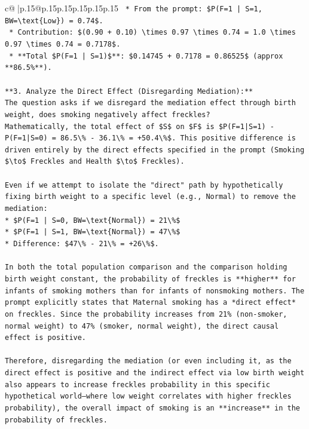 \documentclass{article}
\begin{document}
{\begin{supertabular}{c@{$\;$}|p{.15\linewidth}@{}p{.15\linewidth}p{.15\linewidth}p{.15\linewidth}p{.15\linewidth}p{.15\linewidth}}
{{{\texttt{        *   From the prompt: \$P(F=1 | S=1, BW=\textbackslash{}text\{Low\}) = 0.74\$.} \\
\texttt{        *   Contribution: \$(0.90 + 0.10) \textbackslash{}times 0.97 \textbackslash{}times 0.74 = 1.0 \textbackslash{}times 0.97 \textbackslash{}times 0.74 = 0.7178\$.} \\
\texttt{    *   **Total \$P(F=1 | S=1)\$**: \$0.14745 + 0.7178 = 0.86525\$ (approx **86.5\%**).} \\
\\ 
\texttt{**3. Analyze the Direct Effect (Disregarding Mediation):**} \\
\texttt{The question asks if we disregard the mediation effect through birth weight, does smoking negatively affect freckles?} \\
\texttt{Mathematically, the total effect of \$S\$ on \$F\$ is \$P(F=1|S=1) {-} P(F=1|S=0) = 86.5\textbackslash{}\% {-} 36.1\textbackslash{}\% = +50.4\textbackslash{}\%\$. This positive difference is driven entirely by the direct effects specified in the prompt (Smoking \$\textbackslash{}to\$ Freckles and Health \$\textbackslash{}to\$ Freckles).} \\
\\ 
\texttt{Even if we attempt to isolate the "direct" path by hypothetically fixing birth weight to a specific level (e.g., Normal) to remove the mediation:} \\
\texttt{*   \$P(F=1 | S=0, BW=\textbackslash{}text\{Normal\}) = 21\textbackslash{}\%\$} \\
\texttt{*   \$P(F=1 | S=1, BW=\textbackslash{}text\{Normal\}) = 47\textbackslash{}\%\$} \\
\texttt{*   Difference: \$47\textbackslash{}\% {-} 21\textbackslash{}\% = +26\textbackslash{}\%\$.} \\
\\ 
\texttt{In both the total population comparison and the comparison holding birth weight constant, the probability of freckles is **higher** for infants of smoking mothers than for infants of nonsmoking mothers. The prompt explicitly states that Maternal smoking has a *direct effect* on freckles. Since the probability increases from 21\% (non{-}smoker, normal weight) to 47\% (smoker, normal weight), the direct causal effect is positive.} \\
\\ 
\texttt{Therefore, disregarding the mediation (or even including it, as the direct effect is positive and the indirect effect via low birth weight also appears to increase freckles probability in this specific hypothetical world—where low weight correlates with higher freckles probability), the overall impact of smoking is an **increase** in the probability of freckles.} \\
}}}
\end{supertabular}}
\end{document}
